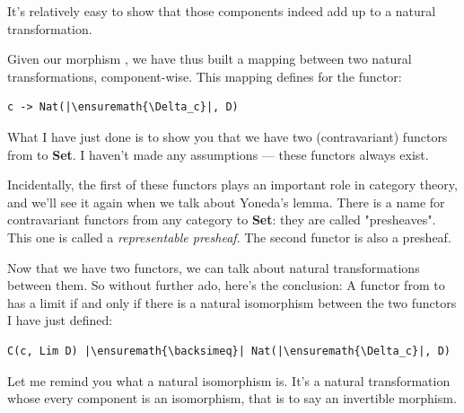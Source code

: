 It's relatively easy to show that those components indeed add up to a
natural transformation.

\begin{figure}[H]
    \centering
\end{figure}

Given our morphism , we have thus built a mapping between two
natural transformations, component-wise. This mapping defines
 for the functor:

\begin{verbatim}
c -> Nat(|\ensuremath{\Delta_c}|, D)
\end{verbatim}

What I have just done is to show you that we have two (contravariant)
functors from  to \textbf{Set}. I haven't made any assumptions
--- these functors always exist.

Incidentally, the first of these functors plays an important role in
category theory, and we'll see it again when we talk about Yoneda's
lemma. There is a name for contravariant functors from any category
 to \textbf{Set}: they are called "presheaves". This one is
called a \emph{representable presheaf}. The second functor is also a
presheaf.

Now that we have two functors, we can talk about natural transformations
between them. So without further ado, here's the conclusion: A functor
 from  to  has a limit  if and
only if there is a natural isomorphism between the two functors I have
just defined:

\begin{verbatim}
C(c, Lim D) |\ensuremath{\backsimeq}| Nat(|\ensuremath{\Delta_c}|, D)
\end{verbatim}

Let me remind you what a natural isomorphism is. It's a natural
transformation whose every component is an isomorphism, that is to say
an invertible morphism.

